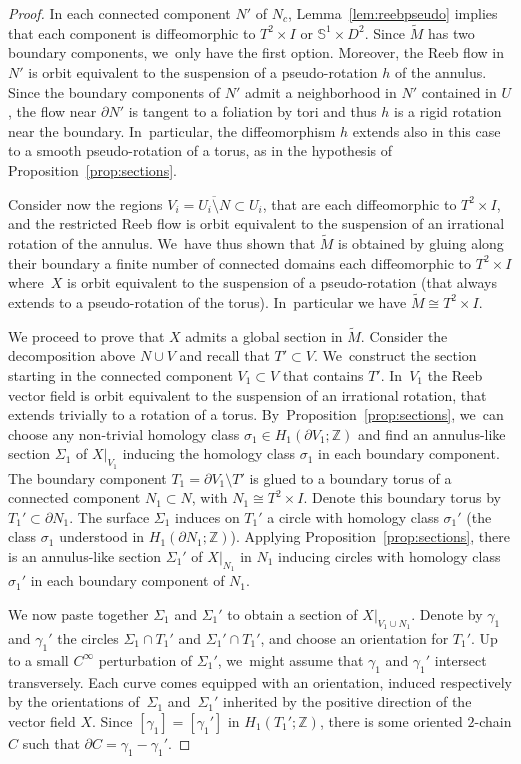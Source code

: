 \documentclass[JEP,XML,SOM,Unicode,NoEqCountersInSection,NoFloatCountersInSection,published]{cedram}
\theoremstyle{definition}
\begin{document}
\begin{proof}
In each connected component $N'$ of $N_c$, Lemma~\ref{lem:reebpseudo} implies that each component is diffeomorphic to $T^2\times I$ or $\mathbb{S}^1\times D^2$. Since $\widetilde M$ has two boundary components, we~only have the first option. Moreover, the Reeb flow in $N'$ is orbit equivalent to the suspension of a pseudo-rotation $h$ of the annulus. Since the boundary components of $N'$ admit a neighborhood in $N'$ contained in $U$, the flow near $\partial N'$ is tangent to a foliation by tori and thus $h$ is a rigid rotation near the boundary. In~particular, the diffeomorphism $h$ extends also in this case to a smooth pseudo-rotation of a torus, as in the hypothesis of Proposition~\ref{prop:sections}.

Consider now the regions $V_i=\overline{U_i\setminus N}\subset U_i$, that are each diffeomorphic to $T^2\times I$, and the restricted Reeb flow is orbit equivalent to the suspension of an irrational rotation of the annulus. We~have thus shown that $\widetilde{M}$ is obtained by gluing along their boundary a finite number of connected domains each diffeomorphic to $T^2\times I$ where~$X$ is orbit equivalent to the suspension of a pseudo-rotation (that always extends to a pseudo-rotation of the torus). In~particular we have $\widetilde{M}\cong T^2\times I$.

{We proceed to prove that $X$ admits a global section in $\widetilde M$.} Consider the decomposition above $N\cup V$ and recall that $T'\subset V$. We~construct the section starting in the connected component $V_1\subset V$ that contains $T'$. In~$V_1$ the Reeb vector field is orbit equivalent to the suspension of an irrational rotation, that extends trivially to a rotation of a torus. By~Proposition~\ref{prop:sections}, we~can choose any non-trivial homology class $\sigma_1 \in H_1(\partial V_1; \mathbb{Z})$ and find an annulus-like section $\Sigma_1$ of $X|_{V_1}$ inducing the homology class $\sigma_1$ in each boundary component. The boundary component $T_1=\partial V_1\setminus T'$ is glued to a boundary torus of a connected component $N_1\subset N$, with $N_1\cong T^2\times I$. Denote this boundary torus by $T_1'\subset \partial N_1$. The surface $\Sigma_1$ induces on $T_1'$ a circle with homology class $\sigma_1'$ (the class $\sigma_1$ understood in $H_1(\partial N_1;\mathbb{Z})$). Applying Proposition~\ref{prop:sections}, there is an annulus-like section $\Sigma_1'$ of $X|_{N_1}$ in $N_1$ inducing circles with homology class~$\sigma_1'$ in each boundary component of $N_1$.

We now paste together $\Sigma_1$ and $\Sigma_1'$ to obtain a section of $X|_{V_1\cup N_1}$. Denote by $\gamma_1$ and $\gamma_1'$ the circles $\Sigma_1\cap T_1'$ and $\Sigma_1'\cap T_1'$, and choose an orientation for $T_1'$. Up to a small $C^\infty$ perturbation of $\Sigma_1'$, we~might assume that $\gamma_1$ and $\gamma_1'$ intersect transversely. Each curve comes equipped with an orientation, induced respectively by the orientations of~$\Sigma_1$ and~$\Sigma_1'$ inherited by the positive direction of the vector field $X$. Since $[\gamma_1]=[\gamma_1']$ in $H_1(T_1';\mathbb{Z})$, there is some oriented $2$-chain $C$ such that $\partial C=\gamma_1-\gamma_1'$.


\end{proof}
\end{document}
